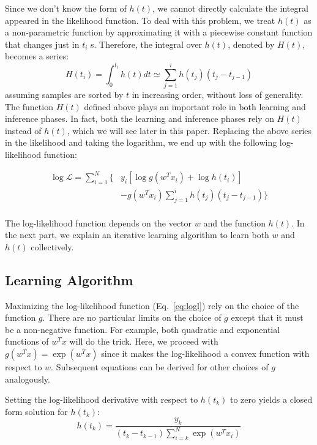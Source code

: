 Since we don't know the form of $h(t)$, we cannot directly calculate the integral appeared in the likelihood function. To deal with this problem, we treat $h(t)$ as a non-parametric function by approximating it with a piecewise constant function that changes just in $t_i$ s. Therefore, the integral over $h(t)$, denoted by $H(t)$, becomes a series:
\begin{equation}\label{eq:cumh}
H(t_i)=\int_{0}^{t_i}h(t)dt \simeq \sum_{j=1}^{i}h(t_j)(t_j-t_{j-1})
\end{equation}
assuming samples are sorted by $t$ in increasing order, without loss of generality. The function $H(t)$ defined above plays an important role in both learning and inference phases. In fact, both the learning and inference phases rely on $H(t)$ instead of $h(t)$, which we will see later in this paper.
Replacing the above series in the likelihood and taking the logarithm, we end up with the following log-likelihood function:

\begin{equation}\label{eq:logl}
\begin{split}
\log\mathcal{L}
=\sum_{i=1}^{N}\Big\lbrace& y_i\left[\log g(w^Tx_i) + \log h(t_i)\right]\\&-g(w^Tx_i)\sum_{j=1}^{i}h(t_j)(t_j-t_{j-1})\Big\rbrace\\
\end{split}
\end{equation}

The log-likelihood function depends on the vector $w$ and the function $h(t)$. In the next part, we explain an iterative learning algorithm to learn both $w$ and $h(t)$ collectively.

\subsection{Learning Algorithm}
Maximizing the log-likelihood function (Eq.~\ref{eq:logl}) rely on the choice of the function $g$. There are no particular limits on the choice of $g$ except that it must be a non-negative function. For example, both quadratic and exponential functions of $w^Tx$ will do the trick. Here, we proceed with $g(w^Tx)=\exp(w^Tx)$ since it makes the log-likelihood a convex function with respect to $w$. Subsequent equations can be derived for other choices of $g$ analogously.

Setting the log-likelihood derivative with respect to $h(t_k)$ to zero yields a closed form solution for $h(t_k)$:
\begin{equation}\label{eq:h}
h(t_k)=\frac{y_k}{(t_k-t_{k-1})\sum_{i=k}^{N}\exp(w^Tx_i)}
\end{equation}

